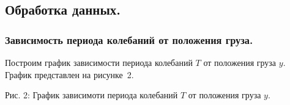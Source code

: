\documentclass[a4paper,11pt]{article}
\begin{document}
\subsection{Обработка данных.}
\subsubsection{Зависимость периода колебаний от положения груза.}
Построим график зависимости периода колебаний $T$ от положения груза $y$. График представлен на рисунке~2.
\begin{center}
\newline
Рис. 2: График зависимоти периода колебаний $T$ от положения груза $y$.\newline
\end{center}
\end{document}
